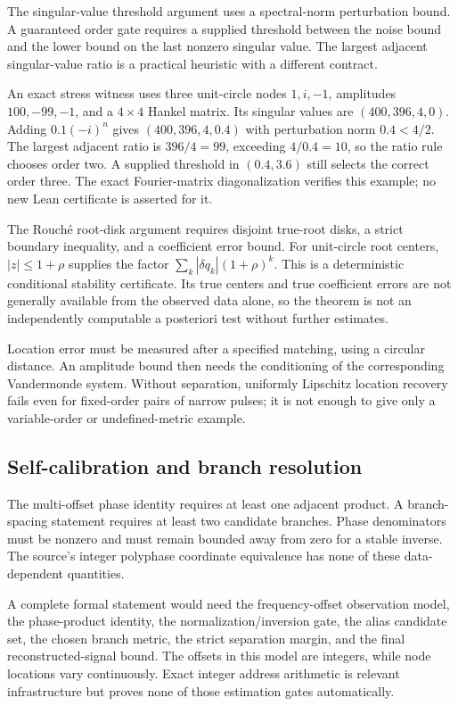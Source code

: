 \documentclass[11pt]{article}
\begin{document}
The singular-value threshold argument uses a spectral-norm perturbation bound. A guaranteed order gate requires a supplied threshold between the noise bound and the lower bound on the last nonzero singular value. The largest adjacent singular-value ratio is a practical heuristic with a different contract.

An exact stress witness uses three unit-circle nodes \(1,i,-1\), amplitudes \(100,-99,-1\), and a \(4\times4\) Hankel matrix. Its singular values are \((400,396,4,0)\). Adding \(0.1(-i)^n\) gives \((400,396,4,0.4)\) with perturbation norm \(0.4<4/2\). The largest adjacent ratio is \(396/4=99\), exceeding \(4/0.4=10\), so the ratio rule chooses order two. A supplied threshold in \((0.4,3.6)\) still selects the correct order three. The exact Fourier-matrix diagonalization verifies this example; no new Lean certificate is asserted for it.

The Rouché root-disk argument requires disjoint true-root disks, a strict boundary inequality, and a coefficient error bound. For unit-circle root centers, \(|z|\le1+\rho\) supplies the factor \(\sum_k|\delta q_k|(1+\rho)^k\). This is a deterministic conditional stability certificate. Its true centers and true coefficient errors are not generally available from the observed data alone, so the theorem is not an independently computable a posteriori test without further estimates.

Location error must be measured after a specified matching, using a circular distance. An amplitude bound then needs the conditioning of the corresponding Vandermonde system. Without separation, uniformly Lipschitz location recovery fails even for fixed-order pairs of narrow pulses; it is not enough to give only a variable-order or undefined-metric example.

\hypertarget{self-calibration-and-branch-resolution}{%
\subsection{Self-calibration and branch resolution}\label{self-calibration-and-branch-resolution}}

The multi-offset phase identity requires at least one adjacent product. A branch-spacing statement requires at least two candidate branches. Phase denominators must be nonzero and must remain bounded away from zero for a stable inverse. The source's integer polyphase coordinate equivalence has none of these data-dependent quantities.

A complete formal statement would need the frequency-offset observation model, the phase-product identity, the normalization/inversion gate, the alias candidate set, the chosen branch metric, the strict separation margin, and the final reconstructed-signal bound. The offsets in this model are integers, while node locations vary continuously. Exact integer address arithmetic is relevant infrastructure but proves none of those estimation gates automatically.
\end{document}
